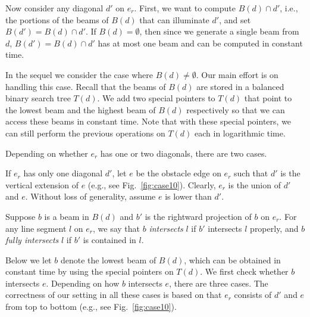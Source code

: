\documentclass[english,runningheads,11pt]{llncs-revised}
\begin{document}
Now consider any diagonal $d'$ on $e_r$.  First, we want to compute $B(d)\cap
d'$, i.e., the portions of the beams of $B(d)$ that can illuminate $d'$, and set $B(d')=B(d)\cap d'$. If $B(d)=\emptyset$, then since we generate a single beam from
$d$, $B(d')=B(d)\cap d'$ has at most one beam
and can be computed in constant time.

In the sequel we consider the case where
$B(d)\neq \emptyset$. Our main effort is on handling this case.
Recall that the beams of $B(d)$ are stored in a
balanced binary search tree $T(d)$. We add two special pointers to
$T(d)$ that point to
the lowest beam and the highest beam of $B(d)$ respectively so that we
can access these beams in constant time. Note that with these special
pointers, we can still perform the previous operations on
$T(d)$ each in logarithmic time.

Depending on whether $e_r$ has one or two diagonals, there are two
cases.

If $e_r$ has only one diagonal $d'$, let $e$ be the obstacle edge on $e_r$ such that $d'$
is the vertical extension of $e$ (e.g., see Fig.~\ref{fig:case10}). Clearly, $e_r$ is the union of $d'$ and $e$.
Without loss of generality, assume $e$ is lower than $d'$.

Suppose $b$ is a beam in $B(d)$ and $b'$ is the rightward
projection of $b$ on $e_r$. For any line segment $l$ on $e_r$,
we say that $b$ {\em intersects} $l$ if $b'$
intersects $l$ properly, and $b$ {\em fully intersects} $l$ if $b'$ is
contained in $l$.



Below we let $b$ denote the lowest beam of
$B(d)$, which can be obtained in constant time by using the special
pointers on $T(d)$.
We first check whether $b$ intersects $e$.
Depending on how $b$ intersects $e$, there are three cases. The correctness of our setting in all these cases is based on that $e_r$ consists of $d'$ and $e$ from top to bottom (e.g., see Fig.~\ref{fig:case10}).
\end{document}
